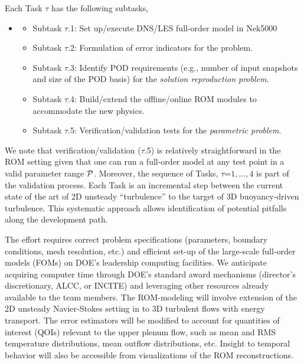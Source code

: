 Each Task $\tau$ has the following subtasks, \\[-4ex]
\begin{itemize}
\item %
   \begin{itemize}
     \item Subtask $\tau$.1: Set up/execute DNS/LES full-order model in Nek5000
\\[-3.6ex]
     \item Subtask $\tau$.2: Formulation of error indicators for the problem.
\\[-3.6ex]
     \item Subtask $\tau$.3: Identify POD requirements (e.g., number of input
                       snapshots and size of the POD basis) for the
                       {\em solution reproduction problem}.
\\[-3.6ex]
     \item Subtask $\tau$.4: Build/extend the offline/online ROM 
                       modules to accommodate the new physics.
\\[-3.6ex]
     \item Subtask $\tau$.5: Verification/validation tests for the {\em parametric problem}. \\[-4ex]
   \end{itemize}
\end{itemize}
We note that verification/validation ($\tau$.5) is relatively straightforward in
the ROM setting given that one can run a full-order model at any test point in
a valid parameter range $\mathcal{P}$.  Moreover, the sequence of Tasks,
$\tau$=$1,\dots,4$ is part of the validation process.  Each Task is an incremental
step between the current state of the art of 2D unsteady ``turbulence'' to the
target of 3D buoyancy-driven turbulence.  This systematic approach allows 
identification of potential pitfalls along the development path.

The effort requires correct problem specifications (parameters, boundary
conditions, mesh resolution, etc.) and efficient set-up of the large-scale
full-order models (FOMs) on DOE's leadership computing facilities.  We
anticipate acquiring computer time through DOE's standard award mechanisms
(director's discretionary, ALCC, or INCITE) and leveraging other resources
already available to the team members.  The ROM-modeling will involve extension
of the 2D unsteady Navier-Stokes setting in \cite{fick18} to 3D turbulent flows
with energy transport.  The error estimators will be modified to account for
quantities of interest (QOIs) relevant to the upper plenum flow, such as mean
and RMS temperature distributions, mean outflow distributions, etc.
Insight to temporal behavior will also be accessible from visualizations
of the ROM reconstructions.

